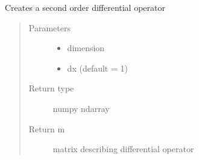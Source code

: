 \documentclass[letterpaper,10pt,english]{sphinxmanual}
\begin{document}
\begin{fulllineitems}
\label{\detokenize{utility_functions:utility_functions.diffop}}
Creates a second order differential operator
\begin{quote}\begin{description}
\item[{Parameters}] \leavevmode\begin{itemize}
\item {} 
 \textendash{} dimension

\item {} 
 \textendash{} dx (default = 1)

\end{itemize}

\item[{Return type}] \leavevmode
numpy ndarray

\item[{Return m}] \leavevmode
matrix describing differential operator

\end{description}\end{quote}

\end{fulllineitems}

\end{document}
